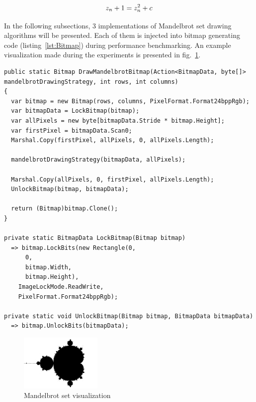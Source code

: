 \begin{equation}
\centering 
z_n + 1 = z_n^2 + c
\label{eq:Mandelbrot}
\end{equation}

In the following subsections, 3 implementations of Mandelbrot set drawing algorithms will be presented. Each of them is injected into bitmap generating code (listing~\ref{lst:Bitmap}) during performance benchmarking. An example visualization made during the experiments is presented in fig.~\ref{fig:MandelbrotVis}.

\begin{lstlisting}[style=sharpcstyle, caption={Mandelbrot bitmap generation}, label={lst:Bitmap},
numbers=none, xleftmargin=0pt,framexleftmargin=0pt,framexrightmargin=0pt,framexbottommargin=0pt]
public static Bitmap DrawMandelbrotBitmap(Action<BitmapData, byte[]> mandelbrotDrawingStrategy, int rows, int columns)
{
  var bitmap = new Bitmap(rows, columns, PixelFormat.Format24bppRgb);
  var bitmapData = LockBitmap(bitmap);
  var allPixels = new byte[bitmapData.Stride * bitmap.Height];
  var firstPixel = bitmapData.Scan0;
  Marshal.Copy(firstPixel, allPixels, 0, allPixels.Length);

  mandelbrotDrawingStrategy(bitmapData, allPixels);

  Marshal.Copy(allPixels, 0, firstPixel, allPixels.Length);
  UnlockBitmap(bitmap, bitmapData);

  return (Bitmap)bitmap.Clone();
}

private static BitmapData LockBitmap(Bitmap bitmap) 
  => bitmap.LockBits(new Rectangle(0,
      0,
      bitmap.Width,
      bitmap.Height),
    ImageLockMode.ReadWrite,
    PixelFormat.Format24bppRgb);

private static void UnlockBitmap(Bitmap bitmap, BitmapData bitmapData) 
  => bitmap.UnlockBits(bitmapData);

\end{lstlisting}

\begin{figure}[!ht]
	\centering
		\includegraphics[width = 0.35\textwidth]{figures04/MandelbrotVis.png}
	\caption{Mandelbrot set visualization}
	\label{fig:MandelbrotVis}
\end{figure}


